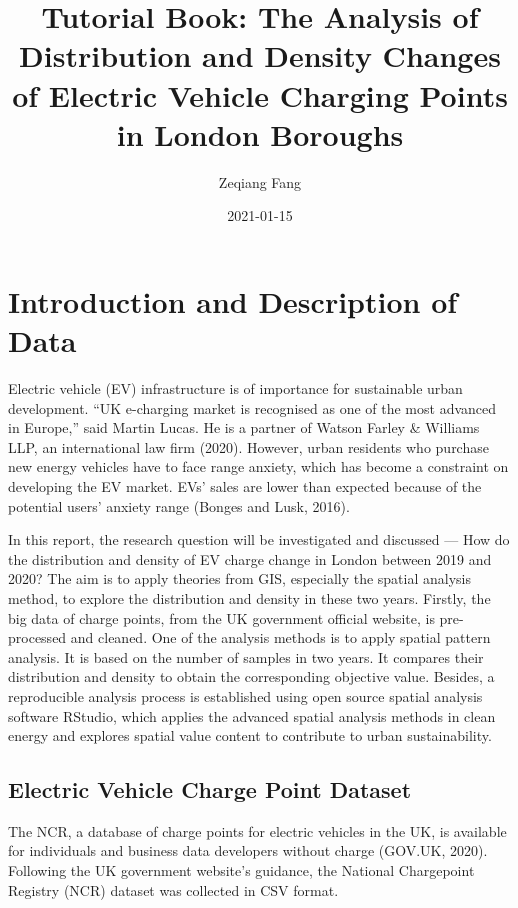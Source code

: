 \documentclass[
]{book}
\title{Tutorial Book: The Analysis of Distribution and Density Changes of Electric Vehicle Charging Points in London Boroughs}
\author{Zeqiang Fang}
\date{2021-01-15}
\begin{document}
\maketitle

{
\setcounter{tocdepth}{1}
\tableofcontents
}
\hypertarget{introduction-and-description-of-data}{%
\chapter{Introduction and Description of Data}\label{introduction-and-description-of-data}}

Electric vehicle (EV) infrastructure is of importance for sustainable urban development. ``UK e-charging market is recognised as one of the most advanced in Europe,'' said Martin Lucas. He is a partner of Watson Farley \& Williams LLP, an international law firm (2020). However, urban residents who purchase new energy vehicles have to face range anxiety, which has become a constraint on developing the EV market. EVs' sales are lower than expected because of the potential users' anxiety range (Bonges and Lusk, 2016).

In this report, the research question will be investigated and discussed --- How do the distribution and density of EV charge change in London between 2019 and 2020? The aim is to apply theories from GIS, especially the spatial analysis method, to explore the distribution and density in these two years. Firstly, the big data of charge points, from the UK government official website, is pre-processed and cleaned. One of the analysis methods is to apply spatial pattern analysis. It is based on the number of samples in two years. It compares their distribution and density to obtain the corresponding objective value. Besides, a reproducible analysis process is established using open source spatial analysis software RStudio, which applies the advanced spatial analysis methods in clean energy and explores spatial value content to contribute to urban sustainability.

\hypertarget{electric-vehicle-charge-point-dataset}{%
\section{Electric Vehicle Charge Point Dataset}\label{electric-vehicle-charge-point-dataset}}

The NCR, a database of charge points for electric vehicles in the UK, is available for individuals and business data developers without charge (GOV.UK, 2020). Following the UK government website's guidance, the National Chargepoint Registry (NCR) dataset was collected in CSV format.
\end{document}
